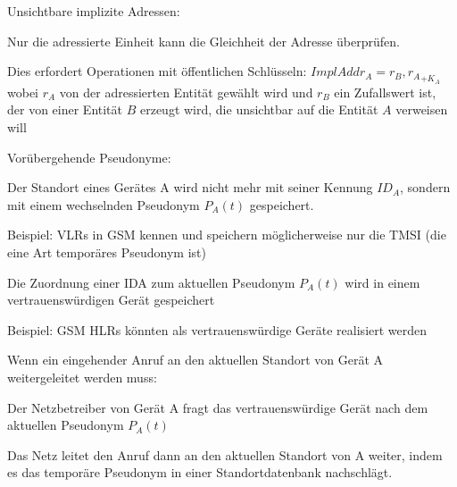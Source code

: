\documentclass[a4paper]{article}
\begin{document}
\begin{multicols}{3}
\begin{itemize*}
\begin{itemize*}
            \end{itemize*}
            \item Unsichtbare implizite Adressen:
            \begin{itemize*}
                  \item Nur die adressierte Einheit kann die Gleichheit der Adresse überprüfen.
                  \item Dies erfordert Operationen mit öffentlichen Schlüsseln: $ImplAddr_A ={r_B, r_A}_{+K_A}$ wobei $r_A$ von der adressierten Entität gewählt wird und $r_B$ ein Zufallswert ist, der von einer Entität $B$ erzeugt wird, die unsichtbar auf die Entität $A$ verweisen will
            \end{itemize*}
      \end{itemize*}
      \begin{itemize*}
            \item Vorübergehende Pseudonyme:
            \begin{itemize*}
                  \item Der Standort eines Gerätes A wird nicht mehr mit seiner Kennung $ID_A$, sondern mit einem wechselnden Pseudonym $P_A(t)$ gespeichert.
                  \begin{itemize*}
                        \item Beispiel: VLRs in GSM kennen und speichern möglicherweise nur die TMSI (die eine Art temporäres Pseudonym ist)
                  \end{itemize*}
                  \item Die Zuordnung einer IDA zum aktuellen Pseudonym $P_A(t)$ wird in einem vertrauenswürdigen Gerät gespeichert
                  \begin{itemize*}
                        \item Beispiel: GSM HLRs könnten als vertrauenswürdige Geräte realisiert werden
                  \end{itemize*}
                  \item Wenn ein eingehender Anruf an den aktuellen Standort von Gerät A weitergeleitet werden muss:
                  \begin{itemize*}
                        \item Der Netzbetreiber von Gerät A fragt das vertrauenswürdige Gerät nach dem aktuellen Pseudonym $P_A(t)$
                        \item Das Netz leitet den Anruf dann an den aktuellen Standort von A weiter, indem es das temporäre Pseudonym in einer Standortdatenbank nachschlägt.

\end{itemize*}
\end{itemize*}
\end{itemize*}
\end{multicols}
\end{document}
